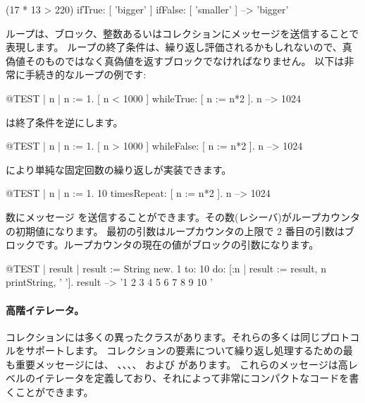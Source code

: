 \documentclass[a4paper,10pt,twoside]{book}
\begin{document}
\begin{code}{}
(17 * 13 > 220)
   ifTrue: [ 'bigger' ]
   ifFalse: [ 'smaller' ] --> 'bigger'
\end{code}

ループは、ブロック、整数あるいはコレクションにメッセージを送信することで表現します。
ループの終了条件は、繰り返し評価されるかもしれないので、真偽値そのものではなく真偽値を返すブロックでなければなりません。
以下は非常に手続き的なループの例です:

\begin{code}{@TEST | n |}
n := 1.
[ n < 1000 ] whileTrue: [ n := n*2 ].
n --> 1024
\end{code}

\noindent
{} は終了条件を逆にします。
\begin{code}{@TEST | n |}
n := 1.
[ n > 1000 ] whileFalse: [ n := n*2 ].
n --> 1024
\end{code}

\noindent
{} により単純な固定回数の繰り返しが実装できます。

\begin{code}{@TEST | n |}
n := 1.
10 timesRepeat: [ n := n*2 ].
n --> 1024
\end{code}

数にメッセージ  を送信することができます。その数(レシーバ)がループカウンタの初期値になります。
最初の引数はループカウンタの上限で 2 番目の引数はブロックです。ループカウンタの現在の値がブロックの引数になります。

\begin{code}{@TEST | result |}
result := String new.
1 to: 10 do: [:n | result := result, n printString, ' '].
result --> '1 2 3 4 5 6 7 8 9 10 '
\end{code}


\paragraph{高階イテレータ。}
コレクションには多くの異ったクラスがあります。それらの多くは同じプロトコルをサポートします。
コレクションの要素について繰り返し処理するための最も重要メッセージには、
、、、、 および  があります。
これらのメッセージは高レベルのイテレータを定義しており、それによって非常にコンパクトなコードを書くことができます。
\end{document}
